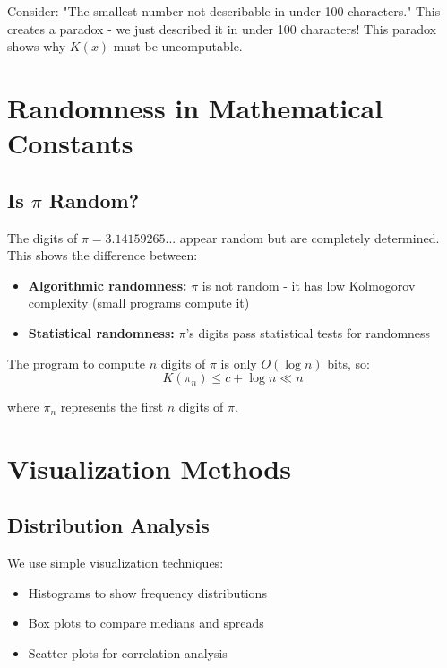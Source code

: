 \documentclass[12pt,a4paper]{report}
\begin{document}
Consider: "The smallest number not describable in under 100 characters." This creates a paradox - we just described it in under 100 characters! This paradox shows why $K(x)$ must be uncomputable.

\section{Randomness in Mathematical Constants}

\subsection{Is $\pi$ Random?}

The digits of $\pi = 3.14159265...$ appear random but are completely determined. This shows the difference between:

\begin{itemize}
    \item \textbf{Algorithmic randomness:} $\pi$ is not random - it has low Kolmogorov complexity (small programs compute it)
    \item \textbf{Statistical randomness:} $\pi$'s digits pass statistical tests for randomness
\end{itemize}

The program to compute $n$ digits of $\pi$ is only $O(\log n)$ bits, so:
\begin{equation}
K(\pi_n) \leq c + \log n \ll n
\end{equation}

where $\pi_n$ represents the first $n$ digits of $\pi$.

\section{Visualization Methods}

\subsection{Distribution Analysis}

We use simple visualization techniques:
\begin{itemize}
    \item Histograms to show frequency distributions
    \item Box plots to compare medians and spreads
    \item Scatter plots for correlation analysis
\end{itemize}
\end{document}
